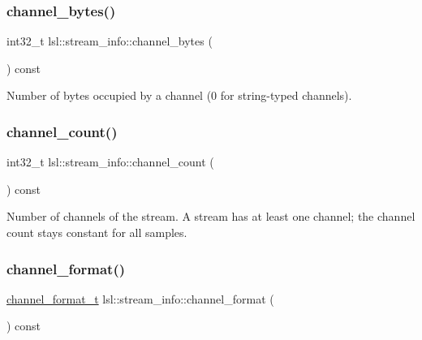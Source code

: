 \subsubsection{\texorpdfstring{channel\+\_\+bytes()}{channel\_bytes()}}
{\footnotesize\ttfamily int32\+\_\+t lsl\+::stream\+\_\+info\+::channel\+\_\+bytes (\begin{DoxyParamCaption}{ }\end{DoxyParamCaption}) const\hspace{0.3cm}{\ttfamily [inline]}}



Number of bytes occupied by a channel (0 for string-\/typed channels). 

\mbox{\label{classlsl_1_1stream__info_acf09957c1c61a9d9e0f9439037eec305}} 
\subsubsection{\texorpdfstring{channel\+\_\+count()}{channel\_count()}}
{\footnotesize\ttfamily int32\+\_\+t lsl\+::stream\+\_\+info\+::channel\+\_\+count (\begin{DoxyParamCaption}{ }\end{DoxyParamCaption}) const\hspace{0.3cm}{\ttfamily [inline]}}

Number of channels of the stream. A stream has at least one channel; the channel count stays constant for all samples. \mbox{\label{classlsl_1_1stream__info_aa9695e52570e617d1c7dd4ea9f88b15d}} 
\subsubsection{\texorpdfstring{channel\+\_\+format()}{channel\_format()}}
{\footnotesize\ttfamily \hyperlink{namespacelsl_a28d50dae6fd82eea8893ce3d63ccd46c}{channel\+\_\+format\+\_\+t} lsl\+::stream\+\_\+info\+::channel\+\_\+format (\begin{DoxyParamCaption}{ }\end{DoxyParamCaption}) const\hspace{0.3cm}{\ttfamily [inline]}}

